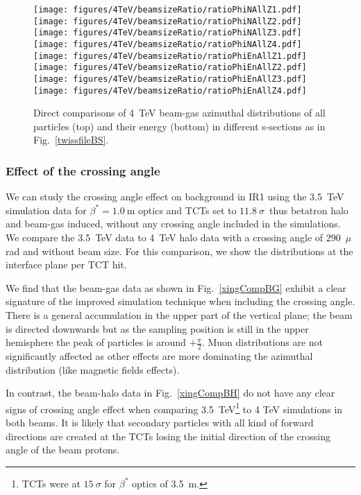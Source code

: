 \begin{figure}%
\begin{center}
  \texttt{[image: figures/4TeV/beamsizeRatio/ratioPhiNAllZ1.pdf]}
  \texttt{[image: figures/4TeV/beamsizeRatio/ratioPhiNAllZ2.pdf]}
  \texttt{[image: figures/4TeV/beamsizeRatio/ratioPhiNAllZ3.pdf]}
  \texttt{[image: figures/4TeV/beamsizeRatio/ratioPhiNAllZ4.pdf]}
  \texttt{[image: figures/4TeV/beamsizeRatio/ratioPhiEnAllZ1.pdf]}
  \texttt{[image: figures/4TeV/beamsizeRatio/ratioPhiEnAllZ2.pdf]}
  \texttt{[image: figures/4TeV/beamsizeRatio/ratioPhiEnAllZ3.pdf]}
  \texttt{[image: figures/4TeV/beamsizeRatio/ratioPhiEnAllZ4.pdf]}
\end{center}
\vspace{-0.6cm}
 \caption{Direct comparisons of 4~TeV beam-gas azimuthal distributions of all particles (top) and their energy (bottom) in different s-sections as in Fig.~\ref{twissfileBS}.
  \label{bsZAll}}
\end{figure}

 
\subsubsection{Effect of the crossing angle}

We can study the crossing angle effect on background in IR1 using the 3.5~TeV simulation data for $\beta^* = 1.0~$m optics and TCTs set to $11.8~\sigma$~\cite{nimPaperRod}thus betatron halo and beam-gas induced, without any crossing angle included in the simulations. We compare the 3.5~TeV data to 4~TeV halo data with a crossing angle of 290~$\mu$rad and without beam size. For this comparison, we show the distributions at the interface plane per TCT hit. 

We find that the beam-gas data as shown in Fig.~\ref{xingCompBG} exhibit a clear signature of the improved simulation technique when including the crossing angle. There is a general accumulation in the upper part of the vertical plane; the beam is directed downwards but as the sampling position is still in the upper hemisphere the peak of particles is around $+ \frac{\pi}{2}$. Muon distributions are not significantly affected as other effects are more dominating the azimuthal distribution (like magnetic fields effects). 

In contrast, the beam-halo data in Fig.~\ref{xingCompBH} do not have any clear signs of crossing angle effect when comparing 3.5~TeV\footnote{TCTs were at $15~\sigma$ for $\beta^*$ optics of 3.5~m.} to 4 TeV simulations in both beams. It is likely that secondary particles with all kind of forward directions are created at the TCTs losing the initial direction of the crossing angle of the beam protons.

